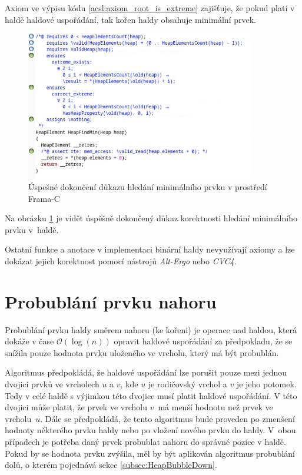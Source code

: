 Axiom ve výpisu kódu \ref{acsl:axiom_root_is_extreme} zajišťuje, že pokud platí v haldě haldové uspořádání, tak kořen haldy obsahuje minimální prvek.

\begin{figure}[H]
	\centering
	\includegraphics[width=10cm]{images/frama-c-HeapFindMin}
	\caption{Úspešné dokončení důkazu hledání minimálního prvku v prostředí Frama-C}
	\label{img:F-C-HeapFindMin}
\end{figure}

Na obrázku \ref{img:F-C-HeapFindMin} je vidět úspěšně dokončený důkaz korektnosti hledání minimálního prvku v~haldě.

Ostatní funkce a anotace v implementaci binární haldy nevyužívají axiomy a lze dokázat jejich korektnost pomocí nástrojů \mbox{\textit{Alt-Ergo}} nebo \textit{CVC4}.

\section{Probublání prvku nahoru}
\label{subsec:HeapBubbleUp}

Probublání prvku haldy směrem nahoru (ke kořeni) je operace nad haldou, která dokáže v čase $\mathcal{O}(\log(n))$ opravit haldové uspořádání za předpokladu, že se snížila pouze hodnota prvku uloženého ve vrcholu, který má být probublán.

Algoritmus předpokládá, že haldové uspořádání lze porušit pouze mezi jednou dvojicí prvků ve vrcholech $u$ a $v$, kde $u$ je rodičovský vrchol a $v$ je jeho potomek. Tedy v celé haldě s výjimkou této dvojice musí platit haldové uspořádání. V této dvojici může platit, že prvek ve vrcholu $v$~má menší hodnotu než prvek ve vrcholu~$u$. Dále se předpokládá, že tento algoritmus bude proveden po zmenšení hodnoty některého prvku haldy nebo po vložení nového prvku do haldy. V~obou případech je potřeba daný prvek probublat nahoru do správné pozice v haldě. Pokud by se hodnota prvku zvýšila, měl by být aplikován algoritmus probublání dolů, o kterém pojednává sekce \ref{subsec:HeapBubbleDown}.

